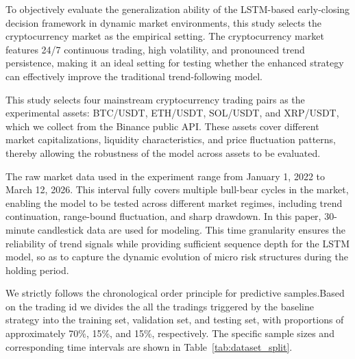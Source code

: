 \documentclass[12pt]{article}
\begin{document}
To objectively evaluate the generalization ability of the LSTM-based early-closing decision 
framework in dynamic market environments, this study selects the cryptocurrency market as the 
empirical setting. The cryptocurrency market features 24/7 continuous trading, high volatility, 
and pronounced trend persistence, making it an ideal setting for testing whether the enhanced 
strategy can effectively improve the traditional trend-following model.

This study selects four mainstream cryptocurrency trading pairs as the 
experimental assets: BTC/USDT, ETH/USDT, SOL/USDT, and XRP/USDT, which we collect from the Binance public API. These assets cover 
different market capitalizations, liquidity characteristics, and price fluctuation patterns, 
thereby allowing the robustness of the model across assets to be evaluated.

The raw market data used in the experiment range from January 1, 2022 to March 12, 2026. This 
interval fully covers multiple bull-bear cycles in the market, enabling the model to be tested 
across different market regimes, including trend continuation, range-bound fluctuation, and 
sharp drawdown. In this paper, 30-minute candlestick data are used for modeling. This time 
granularity ensures the reliability of trend signals while providing sufficient sequence depth 
for the LSTM model, so as to capture the dynamic evolution of micro risk structures during the 
holding period.

We strictly follows the chronological order principle for predictive samples.Based on the trading 
id we  divides the all the tradings triggered by the baseline strategy into the training set, validation set, and testing set, with proportions of 
approximately 70\%, 15\%, and 15\%, respectively. The specific sample sizes and corresponding 
time intervals are shown in Table~\ref{tab:dataset_split}.
\end{document}

